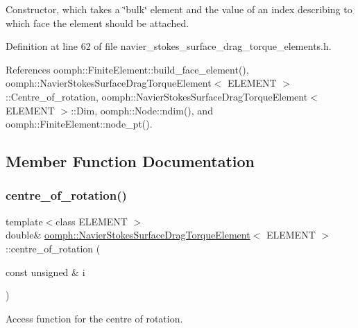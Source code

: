 Constructor, which takes a \char`\"{}bulk\char`\"{} element and the value of an index describing to which face the element should be attached. 



Definition at line 62 of file navier\+\_\+stokes\+\_\+surface\+\_\+drag\+\_\+torque\+\_\+elements.\+h.



References oomph\+::\+Finite\+Element\+::build\+\_\+face\+\_\+element(), oomph\+::\+Navier\+Stokes\+Surface\+Drag\+Torque\+Element$<$ E\+L\+E\+M\+E\+N\+T $>$\+::\+Centre\+\_\+of\+\_\+rotation, oomph\+::\+Navier\+Stokes\+Surface\+Drag\+Torque\+Element$<$ E\+L\+E\+M\+E\+N\+T $>$\+::\+Dim, oomph\+::\+Node\+::ndim(), and oomph\+::\+Finite\+Element\+::node\+\_\+pt().



\subsection{Member Function Documentation}
\mbox{\label{classoomph_1_1NavierStokesSurfaceDragTorqueElement_a8e8ee8de7783e5899909ed0a8842984e}} 
\subsubsection{\texorpdfstring{centre\+\_\+of\+\_\+rotation()}{centre\_of\_rotation()}}
{\footnotesize\ttfamily template$<$class E\+L\+E\+M\+E\+NT $>$ \\
double\& \hyperlink{classoomph_1_1NavierStokesSurfaceDragTorqueElement}{oomph\+::\+Navier\+Stokes\+Surface\+Drag\+Torque\+Element}$<$ E\+L\+E\+M\+E\+NT $>$\+::centre\+\_\+of\+\_\+rotation (\begin{DoxyParamCaption}\item[{const unsigned \&}]{i }\end{DoxyParamCaption})\hspace{0.3cm}{\ttfamily [inline]}}



Access function for the centre of rotation. 



